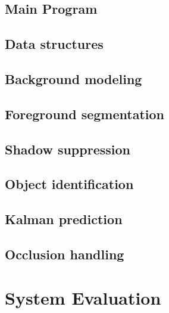 \documentclass[10pt, a4paper, twoside]{article}
\numberwithin{equation}{subsection}
\numberwithin{figure}{section}
\numberwithin{table}{section}
\begin{document}
\newpage
\subsection{Main Program}
\label{sec:main_program}


\newpage
\subsection{Data structures}
\label{sec:data_structures}


\newpage
\subsection{Background modeling}
\label{sec:background_modeling}


\newpage
\subsection{Foreground segmentation}
\label{sec:foreground_segmentation}


\newpage
\subsection{Shadow suppression}
\label{sec:shadow_suppression}


\newpage
\subsection{Object identification}
\label{sec:object_identification}


\newpage
\subsection{Kalman prediction}
\label{sec:kalman_prediction}


\newpage
\subsection{Occlusion handling}
\label{sec:Occlusion}


\newpage
\section{System Evaluation}
\label{sec:evaluation}

\pagebreak
\end{document}
